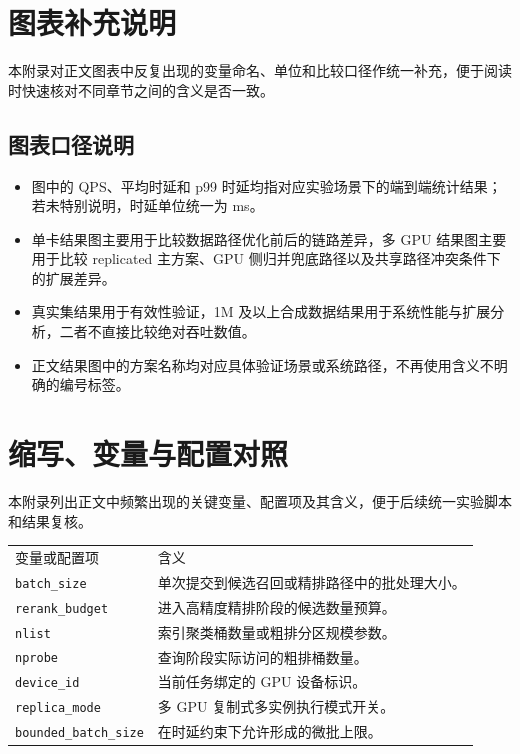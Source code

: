 \chapter{图表补充说明}

本附录对正文图表中反复出现的变量命名、单位和比较口径作统一补充，便于阅读时快速核对不同章节之间的含义是否一致。

\section{图表口径说明}

\begin{itemize}
  \item 图中的 QPS、平均时延和 p99 时延均指对应实验场景下的端到端统计结果；若未特别说明，时延单位统一为 ms。
  \item 单卡结果图主要用于比较数据路径优化前后的链路差异，多 GPU 结果图主要用于比较 replicated 主方案、GPU 侧归并兜底路径以及共享路径冲突条件下的扩展差异。
  \item 真实集结果用于有效性验证，1M 及以上合成数据结果用于系统性能与扩展分析，二者不直接比较绝对吞吐数值。
  \item 正文结果图中的方案名称均对应具体验证场景或系统路径，不再使用含义不明确的编号标签。
\end{itemize}

\chapter{缩写、变量与配置对照}

本附录列出正文中频繁出现的关键变量、配置项及其含义，便于后续统一实验脚本和结果复核。

\renewcommand{\arraystretch}{1.2}
\small
\begin{tabularx}{\textwidth}{>{\raggedright\arraybackslash}p{}>{\raggedright\arraybackslash}X}
变量或配置项 & 含义 \\
\texttt{batch\_size} & 单次提交到候选召回或精排路径中的批处理大小。 \\
\texttt{rerank\_budget} & 进入高精度精排阶段的候选数量预算。 \\
\texttt{nlist} & 索引聚类桶数量或粗排分区规模参数。 \\
\texttt{nprobe} & 查询阶段实际访问的粗排桶数量。 \\
\texttt{device\_id} & 当前任务绑定的 GPU 设备标识。 \\
\texttt{replica\_mode} & 多 GPU 复制式多实例执行模式开关。 \\
\texttt{bounded\_batch\_size} & 在时延约束下允许形成的微批上限。 \\
\end{tabularx}

